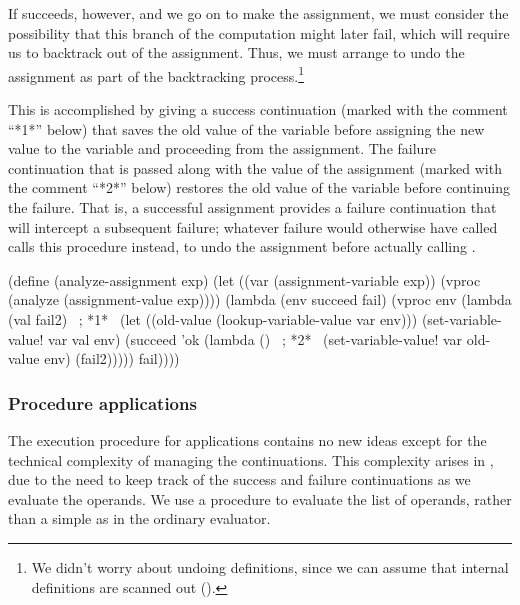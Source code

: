 If  succeeds, however, and we go on to make the assignment, we must
consider the possibility that this branch of the computation might later fail,
which will require us to backtrack out of the assignment.  Thus, we must
arrange to undo the assignment as part of the backtracking process.\footnote{We
didn't worry about undoing definitions, since we can assume that internal
definitions are scanned out ().}

This is accomplished by giving  a success continuation (marked with
the comment ``*1*'' below) that saves the old value of the variable before
assigning the new value to the variable and proceeding from the assignment.
The failure continuation that is passed along with the value of the assignment
(marked with the comment ``*2*'' below) restores the old value of the variable
before continuing the failure.  That is, a successful assignment provides a
failure continuation that will intercept a subsequent failure; whatever failure
would otherwise have called  calls this procedure instead, to undo
the assignment before actually calling .

\begin{codeBlock}
(define (analyze-assignment exp)
  (let ((var (assignment-variable exp))
        (vproc (analyze (assignment-value exp))))
    (lambda (env succeed fail)
      (vproc env
             (lambda (val fail2)        ~\textrm{; *1*}~
               (let ((old-value
                      (lookup-variable-value var env)))
                 (set-variable-value! var val env)
                 (succeed 'ok
                          (lambda ()    ~\textrm{; *2*}~
                            (set-variable-value!
                             var old-value env)
                            (fail2)))))
             fail))))
\end{codeBlock}

\subsubsection*{Procedure applications}

The execution procedure for applications contains no new ideas except for the
technical complexity of managing the continuations.  This complexity arises in
, due to the need to keep track of the success and
failure continuations as we evaluate the operands.  We use a procedure
 to evaluate the list of operands, rather than a simple
 as in the ordinary evaluator.

